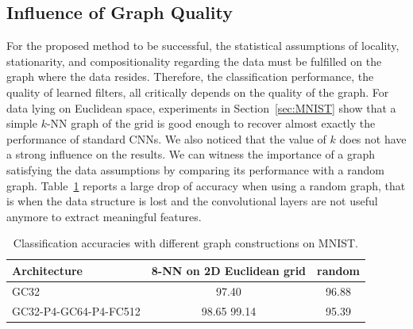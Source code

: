 \documentclass{article}
\newcommand{\tabref}[1]{Table~\ref{tab:#1}}
\newcommand{\secref}[1]{Section~\ref{sec:#1}}
\newcommand{\todo}[1]{{\color{red} #1 }}
\begin{document}
\subsection{Influence of Graph Quality} \label{sec:graph_quality}

For the proposed method to be successful, the statistical assumptions of  locality, stationarity, and compositionality regarding the data must be fulfilled on the graph where the data resides. Therefore, the classification performance, the quality of learned filters, all critically depends on the quality of the graph. For data lying on Euclidean space, experiments in    
 \secref{MNIST} show that a simple $k$-NN graph of the grid is good enough to recover almost exactly the performance of standard CNNs. We also noticed that the value of $k$ does not have a strong influence on the results. We can witness the importance of a graph satisfying the data assumptions by comparing its performance with a random
graph. \tabref{mnist_quality} reports a large drop of accuracy when using a random graph, that is when the data structure is lost and the convolutional layers are not useful anymore to extract meaningful features.




\begin{table}[h!]
\vspace{0.5cm}
\centering
\begin{tabular}{lcc} \toprule
Architecture & 8-NN on 2D Euclidean grid & random \\
\midrule
GC32 & 97.40 & 96.88 \\
GC32-P4-GC64-P4-FC512 & 98.65\todo{99.14} & 95.39 \\
\bottomrule \end{tabular}
\caption{Classification accuracies with different graph constructions on MNIST.} 
\label{tab:mnist_quality}
\end{table}
\end{document}
